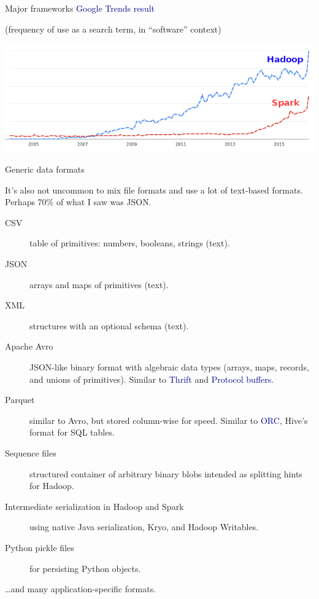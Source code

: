 \documentclass{beamer}
\begin{document}
\begin{frame}{Major frameworks}
\textcolor{darkblue}{Google Trends result}

(frequency of use as a search term, in ``software'' context)

\includegraphics[width=\linewidth]{trends.png}
\end{frame}

\begin{frame}{Generic data formats}

It's also not uncommon to mix file formats and use a lot of text-based formats. Perhaps 70\% of what I saw was JSON.

\begin{description}
\item[CSV] table of primitives: numbers, booleans, strings (text).
\item[JSON] arrays and maps of primitives (text).
\item[XML] structures with an optional schema (text).
\item[Apache Avro] JSON-like binary format with algebraic data types (arrays, maps, records, and unions of primitives). Similar to \textcolor{darkblue}{Thrift} and \textcolor{darkblue}{Protocol buffers}.
\item[Parquet] similar to Avro, but stored column-wise for speed. Similar to \textcolor{darkblue}{ORC}, Hive's format for SQL tables.
\item[Sequence files] structured container of arbitrary binary blobs intended as splitting hints for Hadoop.
\item[Intermediate serialization in Hadoop and Spark] using native Java serialization, Kryo, and Hadoop Writables.
\item[Python pickle files] for persisting Python objects.
\end{description}

\ldots and many application-specific formats.
\end{frame}
\end{document}
